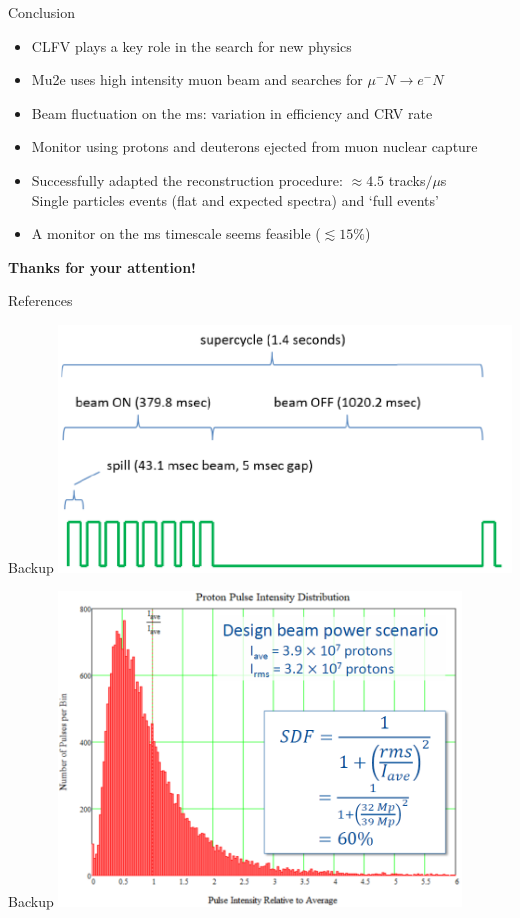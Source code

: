 \documentclass[10pt]{beamer}
\begin{document}
%
\begin{frame}{Conclusion}
\begin{itemize}
\setlength\itemsep{0.4cm}
\item CLFV plays a key role in the search for new physics
\item Mu2e uses high intensity muon beam and searches for $\mu^- N \rightarrow e^- N$
\item Beam fluctuation on the ms: variation in efficiency and CRV rate
\item Monitor using protons and deuterons ejected from muon nuclear capture
\item Successfully adapted the reconstruction procedure: $\approx 4.5$ tracks$/\mu$s\\
Single particles events (flat and expected spectra) and `full events'
\item A monitor on the ms timescale seems feasible ($\lesssim 15 \%$) 
\end{itemize}
\vspace{1cm}
\centering
{\large \textbf{Thanks for your attention!}}
\end{frame}

\begin{frame}[allowframebreaks]{References}
\printbibliography[heading=none]
\end{frame}

\begin{frame}{Backup}
\centering
\includegraphics[width=0.9\textwidth]{beam_time_structure}
\end{frame}

\begin{frame}{Backup}
\centering
\includegraphics[width=0.8\textwidth]{POT_distribution}
\end{frame}
\end{document}
